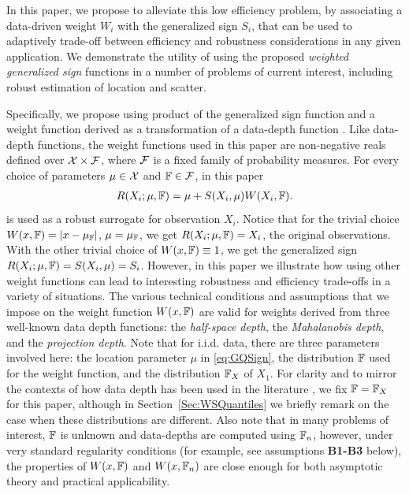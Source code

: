 In this paper, we propose to alleviate this low efficiency problem, by associating 
a data-driven weight $W_{i}$ with the generalized sign $S_{i}$, that can be used 
to adaptively trade-off between efficiency and robustness considerations in any given 
application. We demonstrate the utility of using the proposed \textit{weighted generalized sign} functions in a number of problems of current interest, including robust estimation of location and scatter.

Specifically, we propose using product of the generalized sign function and a weight function derived as a transformation of a data-depth function \citep{ref:DIMACS061_Serfling, ref:AoS00461_ZuoSerfling}. Like data-depth functions, the weight functions used in this paper are non-negative reals defined over $\mathcal{X} \times \mathcal{F}$, where $\mathcal{F}$ is a fixed family of probability measures. For every choice of parameters $\mu \in \mathcal{X}$ and ${\mathbb{F}} \in \mathcal{F}$, in this paper
%
\begin{align}
R (X_{i}; \mu, \BF) = \mu +  S( X_{i}, \mu) W( X_{i}, \BF).
\label{eqn:rank}
\end{align}
%
is used as a robust surrogate for observation $X_{i}$.
Notice that for the trivial choice $W( x, {\mathbb{F}}) = | x - \mu_{{\mathbb{F}}} |$, 
 $\mu = \mu_{{\mathbb{F}}}$,  we get $R (X_{i}; \mu, {\mathbb{F}}) = X_{i}$, the original observations. 
 With the other trivial choice of  $W( x, {\mathbb{F}}) \equiv 1$, we get the 
 generalized  sign $R (X_{i}; \mu, {\mathbb{F}}) = S(X_{i}, \mu) = S_{i}$. 
 However, in this paper we illustrate how using other weight functions
 can lead to interesting robustness and efficiency trade-offs in a variety of situations. 
 The various technical conditions and assumptions that we impose on the 
 weight function $W( x, {\mathbb{F}})$ are valid for weights derived 
 from three well-known data depth functions: the \textit{half-space depth}, 
 the \textit{Mahalanobis depth}, and the \textit{projection depth}. Note that for i.i.d. data, there are three parameters involved here: the location parameter $\mu$ in 
 \eqref{eq:GQSign}, the distribution ${\mathbb{F}}$ used for the weight function, and the distribution ${\mathbb{F}}_{X}$ of $X_{1}$. For clarity and to mirror the contexts of how data depth has been used in the literature \cite{LiuPareliusSingh99, ref:DIMACS061_Serfling}, we fix ${\mathbb{F}} = {\mathbb{F}}_{X}$ for this paper, although in Section~\ref{Sec:WSQuantiles} we briefly remark on the case when these  distributions are different. Also note that 
 in many problems of interest, ${\mathbb{F}}$ is 
unknown and  data-depths are computed using ${\mathbb{F}}_{n}$, however, under very standard regularity conditions (for example, see assumptions \textbf{B1-B3} below), the 
properties of $W (x, {\mathbb{F}})$ and $W (x, {\mathbb{F}}_{n})$ are close enough for both asymptotic theory and practical applicability.  
 
